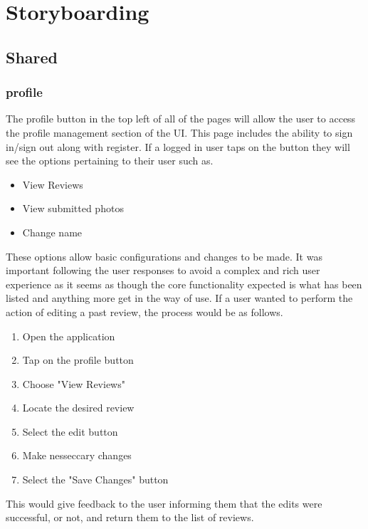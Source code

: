 \documentclass{article}
\begin{document}
\section{Storyboarding}
\subsection{Shared}
\subsubsection{profile}
The profile button in the top left of all of the pages will allow the user to access the profile management section of the UI.
This page includes the ability to sign in/sign out along with register.
If a logged in user taps on the button they will see the options pertaining to their user such as.
\begin{itemize}
	\item View Reviews
	\item View submitted photos
	\item Change name
\end{itemize}
These options allow basic configurations and changes to be made.
It was important following the user responses to avoid a complex and rich user experience as it seems as though the core functionality expected is what has been listed and anything more get in the way of use.
If a user wanted to perform the action of editing a past review, the process would be as follows.
\begin{enumerate}
	\item Open the application
	\item Tap on the profile button
	\item Choose "View Reviews"
	\item Locate the desired review
	\item Select the edit button
	\item Make nesseccary changes
	\item Select the "Save Changes" button
\end{enumerate}
This would give feedback to the user informing them that the edits were successful, or not, and return them to the list of reviews.
\end{document}
